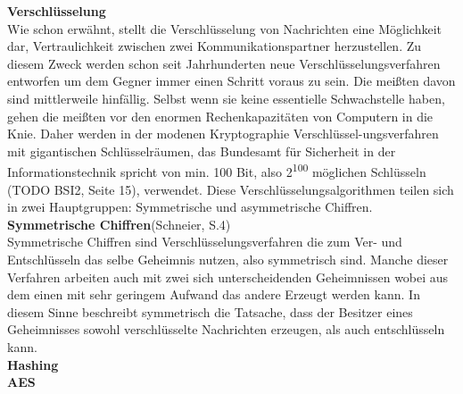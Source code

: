 \documentclass[12pt,a4paper,bibliography=totocnumbered,listof=totocnumbered]{scrartcl}
\begin{document}
\textbf{Verschlüsselung}\\
Wie schon erwähnt, stellt die Verschlüsselung von Nachrichten eine Möglichkeit dar, Vertraulichkeit zwischen zwei Kommunikationspartner herzustellen. Zu diesem Zweck werden schon seit Jahrhunderten neue Verschlüsselungsverfahren entworfen um dem Gegner immer einen Schritt voraus zu sein. Die meißten davon sind mittlerweile hinfällig. Selbst wenn sie keine essentielle Schwachstelle haben, gehen die meißten vor den enormen Rechenkapazitäten von Computern in die Knie. Daher werden in der modenen Kryptographie Verschlüssel-ungsverfahren mit gigantischen Schlüsselräumen, das Bundesamt für Sicherheit in der Informationstechnik spricht von min. 100 Bit, also 2\textsuperscript{100} möglichen Schlüsseln  (TODO BSI2, Seite 15), verwendet. Diese Verschlüsselungsalgorithmen teilen sich in zwei Hauptgruppen: Symmetrische und asymmetrische Chiffren.
\\\textbf{Symmetrische Chiffren}(Schneier, S.4)\\ 
Symmetrische Chiffren sind Verschlüsselungsverfahren die zum Ver- und Entschlüsseln das selbe Geheimnis nutzen, also symmetrisch sind. Manche dieser Verfahren arbeiten auch mit zwei sich unterscheidenden Geheimnissen wobei aus dem einen mit sehr geringem Aufwand das andere Erzeugt werden kann. In diesem Sinne beschreibt symmetrisch die Tatsache, dass der Besitzer eines Geheimnisses sowohl verschlüsselte Nachrichten erzeugen, als auch entschlüsseln kann.
\\\textbf{Hashing}\\
\textbf{AES}\\
\end{document}
